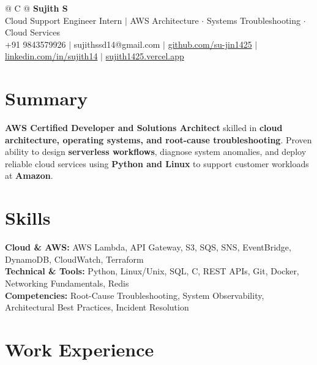 \documentclass[a4paper,11pt]{article}
\newcommand{\ulink}[2]{\href{#1}{#2}}
\begin{document}
\pagestyle{empty}

\begin{tabularx}{\linewidth}{@{} C @{}}
{\color[HTML]{000000}\fontsize{30}{35}\selectfont\bfseries Sujith S} \\[5pt]
{\fontsize{10.5}{12.5}\selectfont\color[HTML]{3A3A3A}
Cloud Support Engineer Intern $|$ AWS Architecture $\cdot$ Systems Troubleshooting $\cdot$ Cloud Services} \\[6pt]
{\fontsize{9.5}{11.5}\selectfont\textcolor[HTML]{3A3A3A}{+91 9843579926 $|$ sujithssd14@gmail.com $|$ \ulink{https://github.com/su-jin1425}{github.com/su-jin1425} $|$ \ulink{https://linkedin.com/in/sujith14}{linkedin.com/in/sujith14} $|$ \ulink{https://sujith1425.vercel.app}{sujith1425.vercel.app}}}
\end{tabularx}

\section{Summary}
\vspace{2pt}

{\color[HTML]{0A0A0A}\fontsize{11}{14}\selectfont
\textbf{AWS Certified Developer and Solutions Architect} skilled in \textbf{cloud architecture, operating systems, and root-cause troubleshooting}. Proven ability to design \textbf{serverless workflows}, diagnose system anomalies, and deploy reliable cloud services using \textbf{Python and Linux} to support customer workloads at \textbf{Amazon}.}

\section{Skills}
\vspace{2pt}

{\color[HTML]{0A0A0A}\fontsize{11}{14}\selectfont
\textbf{Cloud \& AWS:} AWS Lambda, API Gateway, S3, SQS, SNS, EventBridge, DynamoDB, CloudWatch, Terraform \\[2pt]
\textbf{Technical \& Tools:} Python, Linux/Unix, SQL, C, REST APIs, Git, Docker, Networking Fundamentals, Redis \\[2pt]
\textbf{Competencies:} Root-Cause Troubleshooting, System Observability, Architectural Best Practices, Incident Resolution}

\section{Work Experience}
\vspace{2pt}
\end{document}
